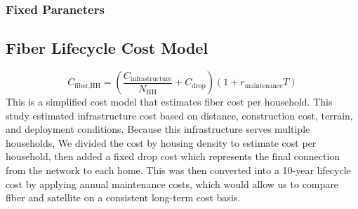 \documentclass[conference]{IEEEtran}
\begin{document}
\subsubsection {Fixed Paraneters}
\begin{table}[htbp]
\centering
\small
\caption{Sensitivity Analysis Input and Control Parameters}
\label{tab:sensitivity_params}
\vspace{2mm}
\end{table}
\subsection{Fiber Lifecycle Cost Model}
\[
C_{\text{fiber,HH}}
=
\left(
\frac{C_{\text{infrastructure}}}{N_{\text{HH}}}
+
C_{\text{drop}}
\right)
\left(1+r_{\text{maintenance}}T\right)
\]
This is a simplified cost model that estimates fiber cost per household. This study estimated infrastructure cost based on distance, construction cost, terrain, and deployment conditions. Because this infrastructure serves multiple households, We divided the cost by housing density to estimate cost per household, then added a fixed drop cost which represents the final connection from the network to each home. This was then converted into a 10-year lifecycle cost by applying annual maintenance costs, which would allow us to compare fiber and satellite on a consistent long-term cost basis.
\end{document}
